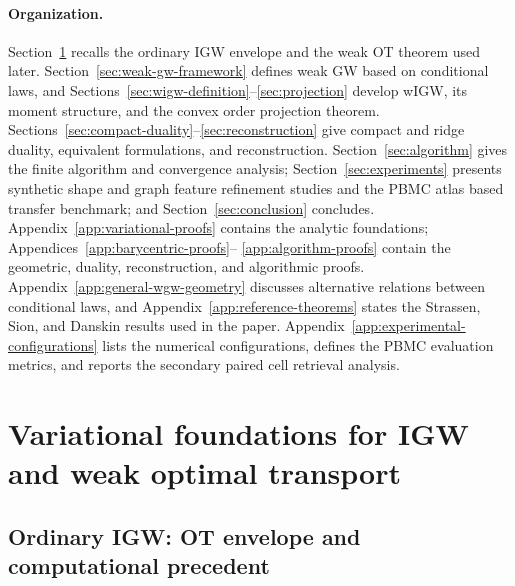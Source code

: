 \documentclass[11pt]{article}
\theoremstyle{plain}
\theoremstyle{definition}
\theoremstyle{remark}
\begin{document}
\paragraph{Organization.}
Section~\ref{sec:variational-foundations} recalls the ordinary IGW envelope and the
weak OT theorem used later. Section~\ref{sec:weak-gw-framework} defines weak GW
based on conditional laws, and Sections~\ref{sec:wigw-definition}--\ref{sec:projection}
develop wIGW, its moment structure, and the convex order projection theorem.
Sections~\ref{sec:compact-duality}--\ref{sec:reconstruction} give compact and ridge
duality, equivalent formulations, and reconstruction. Section~\ref{sec:algorithm}
gives the finite algorithm and convergence analysis; Section~\ref{sec:experiments}
presents synthetic shape and graph feature refinement studies and the PBMC
atlas based transfer benchmark; and
Section~\ref{sec:conclusion} concludes. Appendix~\ref{app:variational-proofs}
contains the analytic foundations; Appendices~\ref{app:barycentric-proofs}--
\ref{app:algorithm-proofs} contain the geometric, duality, reconstruction, and
algorithmic proofs. Appendix~\ref{app:general-wgw-geometry} discusses alternative
relations between conditional laws, and Appendix~\ref{app:reference-theorems}
states the Strassen, Sion, and Danskin results used in the paper.
Appendix~\ref{app:experimental-configurations} lists the numerical
configurations, defines the PBMC evaluation metrics, and reports the secondary
paired cell retrieval analysis.

\section{Variational foundations for IGW and weak optimal transport}
\label{sec:variational-foundations}

\subsection{Ordinary IGW: OT envelope and computational precedent}
\label{subsec:ordinary-igw}
\end{document}
